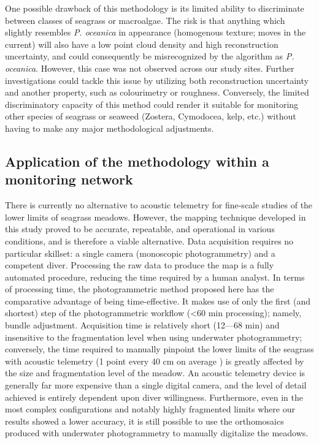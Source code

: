 One possible drawback of this methodology is its limited ability to discriminate between classes of seagrass or macroalgae. The risk is that anything which slightly resembles \textit{P. oceanica} in appearance (homogenous texture; moves in the current) will also have a low point cloud density and high reconstruction uncertainty, and could consequently be misrecognized by the algorithm as \textit{P. oceanica}. However, this case was not observed across our study sites. Further investigations could tackle this issue by utilizing both reconstruction uncertainty and another property, such as colourimetry or roughness. Conversely, the limited discriminatory capacity of this method could render it suitable for monitoring other species of seagrass or seaweed (Zostera, Cymodocea, kelp, etc.) without having to make any major methodological adjustments.

\subsection{Application of the methodology within a monitoring network}
There is currently no alternative to acoustic telemetry for fine-scale studies of the lower limits of seagrass meadows. However, the mapping technique developed in this study proved to be accurate, repeatable, and operational in various conditions, and is therefore a viable alternative. Data acquisition requires no particular skillset: a single camera (monoscopic photogrammetry) and a competent diver. Processing the raw data to produce the map is a fully automated procedure, reducing the time required by a human analyst. In terms of processing time, the photogrammetric method proposed here has the comparative advantage of being time-effective. It makes use of only the first (and shortest) step of the photogrammetric workflow (<60 min processing); namely, bundle adjustment. Acquisition time is relatively short (12---68 min) and insensitive to the fragmentation level when using underwater photogrammetry; conversely, the time required to manually pinpoint the lower limits of the seagrass with acoustic telemetry (1 point every 40 cm on average \citep{descamp_fast_2011}) is greatly affected by the size and fragmentation level of the meadow. An acoustic telemetry device is generally far more expensive than a single digital camera, and the level of detail achieved is entirely dependent upon diver willingness. Furthermore, even in the most complex configurations and notably highly fragmented limits where our results showed a lower accuracy, it is still possible to use the orthomosaics produced with underwater photogrammetry to manually digitalize the meadows.

